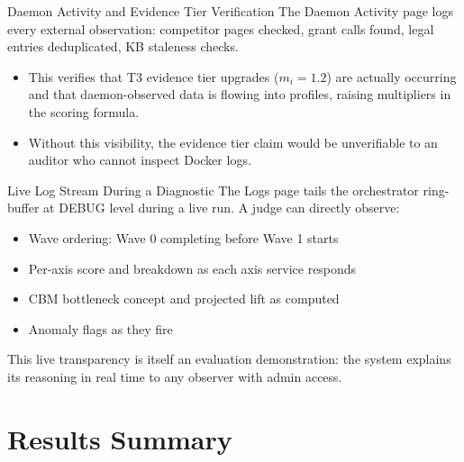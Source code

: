 \documentclass[11pt,a4paper]{article}
\begin{document}
\begin{adminbox}{Daemon Activity and Evidence Tier Verification}
The Daemon Activity page logs every external observation: competitor pages checked,
grant calls found, legal entries deduplicated, KB staleness checks.
\begin{itemize}[leftmargin=1em]
  \item This verifies that T3 evidence tier upgrades ($m_i = 1.2$) are actually occurring
        and that daemon-observed data is flowing into profiles, raising multipliers in
        the scoring formula.
  \item Without this visibility, the evidence tier claim would be unverifiable to an
        auditor who cannot inspect Docker logs.
\end{itemize}
\end{adminbox}

\begin{adminbox}{Live Log Stream During a Diagnostic}
The Logs page tails the orchestrator ring-buffer at DEBUG level during a live run.
A judge can directly observe:
\begin{itemize}[leftmargin=1em]
  \item Wave ordering: Wave 0 completing before Wave 1 starts
  \item Per-axis score and breakdown as each axis service responds
  \item CBM bottleneck concept and projected lift as computed
  \item Anomaly flags as they fire
\end{itemize}
This live transparency is itself an evaluation demonstration: the system explains its
reasoning in real time to any observer with admin access.
\end{adminbox}

\section{Results Summary}
\end{document}
